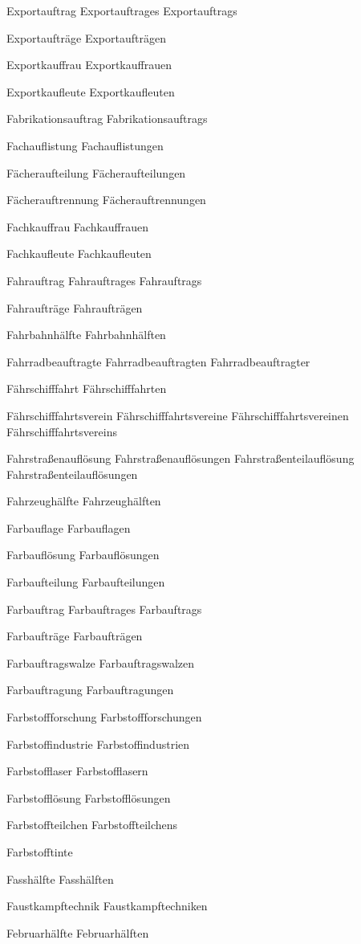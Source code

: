 Exportauftrag
Exportauftrages
Exportauftrags

Exportaufträge
Exportaufträgen

Exportkauffrau
Exportkauffrauen

Exportkaufleute
Exportkaufleuten

Fabrikationsauftrag
Fabrikationsauftrags

Fachauflistung
Fachauflistungen

Fächeraufteilung
Fächeraufteilungen

Fächerauftrennung
Fächerauftrennungen

Fachkauffrau
Fachkauffrauen

Fachkaufleute
Fachkaufleuten

Fahrauftrag
Fahrauftrages
Fahrauftrags

Fahraufträge
Fahraufträgen

Fahrbahnhälfte
Fahrbahnhälften

Fahrradbeauftragte
Fahrradbeauftragten
Fahrradbeauftragter

Fährschifffahrt
Fährschifffahrten

Fährschifffahrtsverein
Fährschifffahrtsvereine
Fährschifffahrtsvereinen
Fährschifffahrtsvereins

Fahrstraßenauflösung
Fahrstraßenauflösungen
Fahrstraßenteilauflösung
Fahrstraßenteilauflösungen

Fahrzeughälfte
Fahrzeughälften

Farbauflage
Farbauflagen

Farbauflösung
Farbauflösungen

Farbaufteilung
Farbaufteilungen

Farbauftrag
Farbauftrages
Farbauftrags

Farbaufträge
Farbaufträgen

Farbauftragswalze
Farbauftragswalzen

Farbauftragung
Farbauftragungen

Farbstoffforschung
Farbstoffforschungen

Farbstoffindustrie
Farbstoffindustrien

Farbstofflaser
Farbstofflasern

Farbstofflösung
Farbstofflösungen

Farbstoffteilchen
Farbstoffteilchens

Farbstofftinte

Fasshälfte
Fasshälften

Faustkampftechnik
Faustkampftechniken

Februarhälfte
Februarhälften


